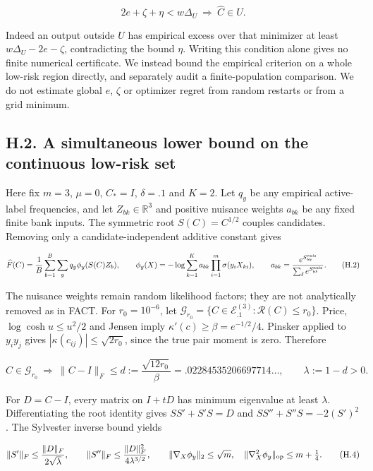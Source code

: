 \documentclass{article}
\begin{document}
\[
2e+\zeta+\eta<w\Delta_U\ \Longrightarrow\ \widehat C\in U.
\tag{H.1}
\]

Indeed an output outside \(U\) has empirical excess over that minimizer
at least \(w\Delta_U-2e-\zeta\), contradicting the bound \(\eta\).
Writing this condition alone gives no finite numerical certificate. We
instead bound the empirical criterion on a whole low-risk region
directly, and separately audit a finite-population comparison. We do not
estimate global \(e\), \(\zeta\) or optimizer regret from random
restarts or from a grid minimum.

\subsection*{H.2. A simultaneous lower bound on the continuous low-risk
set}\label{h.2.-a-simultaneous-lower-bound-on-the-continuous-low-risk-set}

Here fix \(m=3\), \(\mu=0\), \(C_*=I\), \(\delta=.1\) and \(K=2\). Let
\(q_y\) be any empirical active-label frequencies, and let
\(Z_{bk}\in\mathbb R^3\) and positive nuisance weights \(a_{bk}\) be any
fixed finite bank inputs. The symmetric root \(S(C)=C^{1/2}\) couples
candidates. Removing only a candidate-independent additive constant
gives

\[
\widehat F(C)=\frac1B\sum_{b=1}^{B}\sum_yq_y\phi_y(S(C)Z_b),\qquad
\phi_y(X)=-\log\sum_{k=1}^K a_{bk}\prod_{i=1}^m\sigma(y_iX_{ki}),\qquad
a_{bk}=\frac{e^{S_{bk}^{\rm nuis}}}{\sum_\ell e^{S_{b\ell}^{\rm nuis}}}.
\tag{H.2}
\]

The nuisance weights remain random likelihood factors; they are not
analytically removed as in FACT. For \(r_0=10^{-6}\), let
\(\mathcal G_{r_0}=\{C\in\mathcal E_{.1}^{(3)}:\mathcal R(C)\le r_0\}\).
Price, \(\log\cosh u\le u^2/2\) and Jensen imply
\(\kappa'(c)\ge\beta=e^{-1/2}/4\). Pinsker applied to \(y_iy_j\) gives
\(|\kappa(c_{ij})|\le\sqrt{2r_0}\), since the true pair moment is zero.
Therefore

\[
C\in\mathcal G_{r_0}\ \Longrightarrow\
\|C-I\|_F\le d:=\frac{\sqrt{12r_0}}{\beta}=.02284535206697714\ldots,
\qquad\lambda:=1-d>0.
\tag{H.3}
\]

For \(D=C-I\), every matrix on \(I+tD\) has minimum eigenvalue at least
\(\lambda\). Differentiating the root identity gives \(SS'+S'S=D\) and
\(SS''+S''S=-2(S')^2\). The Sylvester inverse bound yields

\[
\|S'\|_F\le\frac{\|D\|_F}{2\sqrt\lambda},\qquad
\|S''\|_F\le\frac{\|D\|_F^2}{4\lambda^{3/2}},\qquad
\|\nabla_X\phi_y\|_2\le\sqrt m,\quad
\|\nabla_X^2\phi_y\|_{\rm op}\le m+\tfrac14.
\tag{H.4}
\]
\end{document}
